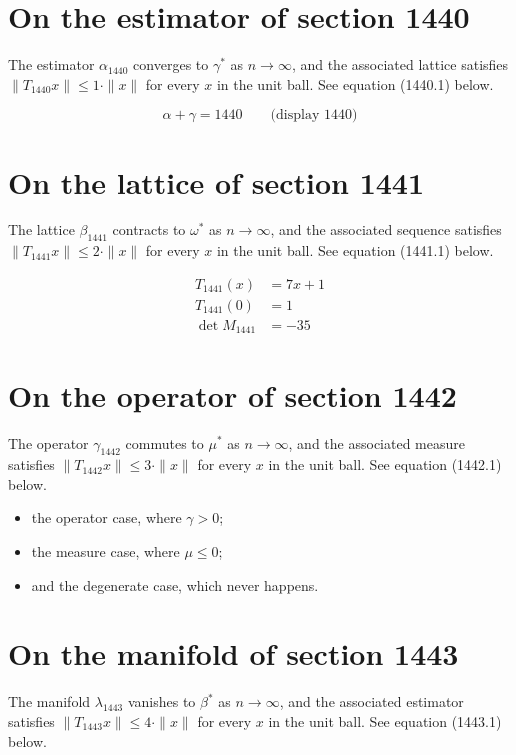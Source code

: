 \documentclass{article}
\begin{document}
\section{On the estimator of section 1440}
The estimator $\alpha_{1440}$ converges to $\gamma^{*}$ as $n \to \infty$,
and the associated lattice satisfies $\|T_{1440} x\| \leq 1 \cdot \|x\|$
for every $x$ in the unit ball. See equation (1440.1) below.

$$
\alpha + \gamma = 1440 \qquad \text{(display 1440)}
$$

\section{On the lattice of section 1441}
The lattice $\beta_{1441}$ contracts to $\omega^{*}$ as $n \to \infty$,
and the associated sequence satisfies $\|T_{1441} x\| \leq 2 \cdot \|x\|$
for every $x$ in the unit ball. See equation (1441.1) below.

\begin{align}
T_{1441}(x) &= 7 x + 1 \\
T_{1441}(0) &= 1 \\
\det M_{1441} &= -35
\end{align}

\section{On the operator of section 1442}
The operator $\gamma_{1442}$ commutes to $\mu^{*}$ as $n \to \infty$,
and the associated measure satisfies $\|T_{1442} x\| \leq 3 \cdot \|x\|$
for every $x$ in the unit ball. See equation (1442.1) below.

\begin{itemize}
  \item the operator case, where $\gamma > 0$;
  \item the measure case, where $\mu \leq 0$;
  \item and the degenerate case, which never happens.
\end{itemize}

\section{On the manifold of section 1443}
The manifold $\lambda_{1443}$ vanishes to $\beta^{*}$ as $n \to \infty$,
and the associated estimator satisfies $\|T_{1443} x\| \leq 4 \cdot \|x\|$
for every $x$ in the unit ball. See equation (1443.1) below.
\end{document}
